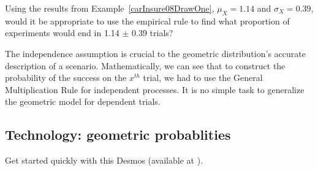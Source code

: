 
\begin{exercisewrap}
\begin{nexercise}
Using the results from Example~\ref{carInsure08DrawOne},
$\mu_{\scriptscriptstyle{X}} = 1.14$ and $\sigma_{\scriptscriptstyle{X}} = 0.39$, would it be appropriate
to use the empirical rule to find what proportion
of experiments would end in 1.14 $\pm$ 0.39 trials?\footnotemark{}
\end{nexercise}
\end{exercisewrap}

The independence assumption is crucial to the geometric
distribution's accurate description of a scenario.
Mathematically, we can see that to construct the probability
of the success on the $x^{th}$ trial, we had to use the
General Multiplication Rule for independent processes.
It is no simple task to generalize the geometric model
for dependent trials.



\subsection{Technology: geometric probablities}

\noindent Get started quickly with this Desmos  (\small{available at }).

\begin{center}
\end{center}

